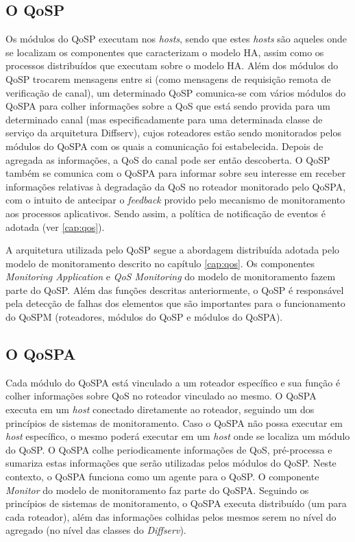 \subsection{O QoSP}
	Os módulos do QoSP executam nos \textit{hosts}, sendo que estes \textit{hosts} são aqueles onde se localizam os componentes que caracterizam o modelo HA, assim como os processos distribuídos que executam sobre o modelo HA. Além dos módulos do QoSP trocarem mensagens entre si (como mensagens de requisição remota de verificação de canal), um determinado QoSP comunica-se com vários módulos do QoSPA para colher informações sobre a QoS que está sendo provida para um determinado canal (mas especificadamente para uma determinada classe de serviço da arquitetura Diffserv), cujos roteadores estão sendo monitorados pelos módulos do QoSPA com os quais a comunicação foi estabelecida. Depois de agregada as informações, a QoS do canal pode ser então descoberta. O QoSP também se comunica com o QoSPA para informar sobre seu interesse em receber informações relativas à degradação da QoS no roteador monitorado pelo QoSPA, com o intuito de antecipar o \textit{feedback} provido pelo mecanismo de monitoramento aos processos aplicativos. Sendo assim, a política de notificação de eventos é adotada (ver \ref{cap:qos}).
	
	A arquitetura utilizada pelo QoSP segue a abordagem distribuída adotada pelo modelo de monitoramento descrito no capítulo \ref{cap:qos}. Os componentes \textit{Monitoring Application} e \textit{QoS Monitoring} do modelo de monitoramento fazem parte do QoSP. Além das funções descritas anteriormente, o QoSP é responsável pela detecção de falhas dos elementos que são importantes para o funcionamento do QoSPM (roteadores, módulos do QoSP e módulos do QoSPA).
	
\subsection{O QoSPA}
	Cada módulo do QoSPA está vinculado a um roteador específico e sua função é colher informações sobre QoS no roteador vinculado ao mesmo. O QoSPA executa em um \textit{host} conectado diretamente ao roteador, seguindo um dos princípios de sistemas de monitoramento. Caso o QoSPA não possa executar em \textit{host} específico, o mesmo poderá executar em um \textit{host} onde se localiza um módulo do QoSP. O QoSPA colhe periodicamente informações de QoS, pré-processa e sumariza estas informações que serão utilizadas pelos módulos do QoSP. Neste contexto, o QoSPA funciona como um agente para o QoSP. O componente \textit{Monitor} do modelo de monitoramento faz parte do QoSPA. Seguindo os princípios de sistemas de monitoramento, o QoSPA executa distribuído (um para cada roteador), além das informações colhidas pelos mesmos serem no nível do agregado (no nível das classes do \textit{Diffserv}).
	
